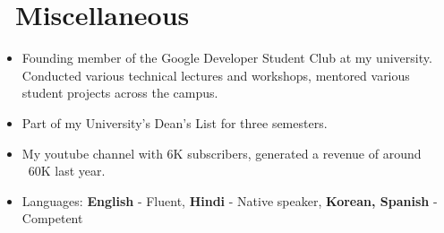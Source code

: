 \documentclass{resume}
\begin{document}
\section{\faInfo\ Miscellaneous}
\begin{itemize}[parsep=0.5ex]
  \item Founding member of the Google Developer Student Club at my university. Conducted various technical lectures and workshops, mentored various student projects across the campus.
  \item Part of my University’s Dean’s List for three semesters.
  \item {} My youtube channel with 6K subscribers, generated a revenue of around \rupee~60K last year.
  \item Languages: \textbf{English} - Fluent, \textbf{Hindi} - Native speaker, \textbf{Korean, Spanish} - Competent
\end{itemize}

%
%
\end{document}
